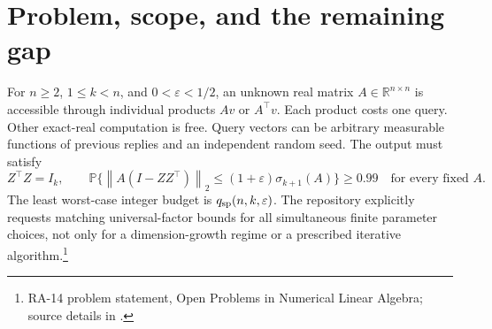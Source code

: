 \documentclass[11pt]{article}
\theoremstyle{definition}
\newcommand{\R}{\mathbb R}
\newcommand{\Prob}{\mathbb P}
\newcommand{\norm}[1]{\left\lVert#1\right\rVert}
\begin{document}
\begin{abstract}
An exact minimum-energy criterion characterizes when a given linear feature space contains a valid spectral rank-$k$ approximation. It includes singular tail features and unequal leading singular values. For Gaussian block-Krylov features on interpolation nodes, the criterion becomes a $k\times k$ random matrix inequality. An exact reciprocal-Gram first moment replaces the earlier product of operator-norm bounds and gives an explicit success-probability bound.

A conditional-rotation simulation then applies this bound to fully adaptive, individually charged queries, provided that the number of queries introducing directions outside the previous query-and-response span is controlled. The resulting theorem is a probability tradeoff for unrestricted algorithms, not a new unconditional bound on their total query complexity. A complementary algebraic theorem shows that the enlarged full-prefix space contains the exact leading eigenspace once its Gaussian feature dimension saturates the ambient dimension. Consequently, that enlargement cannot simply be used to eliminate the innovation qualifier.

The unrestricted finite-parameter characterization requested by RA-14 is \textbf{not completed}. The inherited bounds remain unchanged. This is a partial, unreviewed mathematical continuation; no independent certification, proof-assistant verification, or percentage-completion claim is made.
\end{abstract}
\setcounter{tocdepth}{1}
\newpage\tableofcontents
\newpage

\section{Problem, scope, and the remaining gap}
For $n\ge2$, $1\le k<n$, and $0<\varepsilon<1/2$, an unknown real matrix $A\in\R^{n\times n}$ is accessible through individual products $Av$ or $A^\top v$. Each product costs one query. Other exact-real computation is free. Query vectors can be arbitrary measurable functions of previous replies and an independent random seed. The output must satisfy
\begin{equation}\label{eq:target}
 Z^\top Z=I_k,\qquad
 \Prob\{\norm{A(I-ZZ^\top)}_2\le(1+\varepsilon)\sigma_{k+1}(A)\}\ge0.99
 \quad\text{for every fixed }A.
\end{equation}
The least worst-case integer budget is $q_{\rm sp}(n,k,\varepsilon)$. The repository explicitly requests matching universal-factor bounds for all simultaneous finite parameter choices, not only for a dimension-growth regime or a prescribed iterative algorithm.\footnote{RA-14 problem statement, Open Problems in Numerical Linear Algebra; source details in \cite{repo}.}
\end{document}
